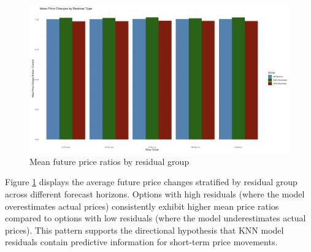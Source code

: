 \documentclass{article}
\begin{document}
\begin{table}[h]
  \centering
  \caption{Mean future price ratios by residual group and associated $p$-values. * indicates significance at $p = 0.05$.}
  \label{tab:mean-return}
\end{table}


\begin{figure}[h]
  \centering
  \includegraphics[width=0.8\linewidth]{data/results/mean_price_diff.png}
  \caption{Mean future price ratios by residual group}
  \label{fig:price-diff}
\end{figure}

Figure \ref{fig:price-diff} displays the average future price changes stratified by residual group across different forecast horizons. Options with high residuals (where the model overestimates actual prices) consistently exhibit higher mean price ratios compared to options with low residuals (where the model underestimates actual prices). This pattern supports the directional hypothesis that KNN model residuals contain predictive information for short-term price movements.
\end{document}
